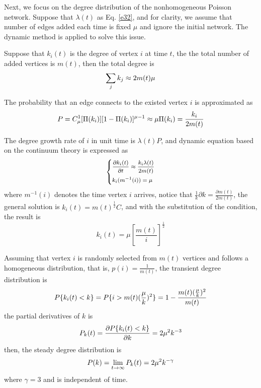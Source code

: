 \documentclass[final]{IEEEtran}
\begin{document}

Next, we focus on the degree distribution of the nonhomogeneous
Poisson network. Suppose that $\lambda (t)$ as Eq. \ref{e32}, and
for clarity, we assume that number of edges added each time is
fixed $\mu$ and ignore the initial network. The dynamic method is
applied to solve this issue.


Suppose that $k_{i}(t)$ is the degree of vertex $i$ at time $t$,
the the total number of added vertices is $m(t)$, then the total
degree is
\begin{equation}\footnotesize
\sum\limits_{j}k_{j}\approx2m(t)\mu
\end{equation}


The probability that an edge connects to the existed vertex $i$ is
approximated as
\begin{equation}\footnotesize
P=C_{\mu}^{1}[\Pi(k_{i})][1-\Pi(k_{i})]^{\mu-1}\approx\mu\Pi(k_{i})=\frac{k_{i}}{2m(t)}
\end{equation}

The degree growth rate of $i$ in unit time is $\lambda (t) P$, and
dynamic equation based on the continuum theory is expressed as
\begin{equation}\footnotesize
  \left\{
   \begin{aligned}
   &\frac{\partial k_{i}(t)}{\partial t} \approx\frac{k_{i}\lambda(t)}{2m(t)}\\
&k_{i}(m^{-1}(i))=\mu\\
   \end{aligned}
   \right.
  \end{equation}
where $m^{-1}(i)$ denotes the time vertex $i$ arrives, notice that
$\frac{1}{k}\partial k$$=$$\frac{\partial m(t)}{2m(t)}$, the
general solution is $k_{i}(t)$$=$$m(t)^{\frac{1}{2}}C$, and with
the substitution of the condition, the result is
\begin{equation}
k_{i}(t)=\mu[\frac{m(t)}{i}]^{\frac{1}{2}}
\end{equation}


Assuming that vertex $i$ is randomly selected from $m(t)$ vertices
and follows a homogeneous distribution, that is,
$p(i)$$=$$\frac{1}{m(t)}$, the transient degree distribution is
\begin{equation}\footnotesize
P\{k_{i}(t)<k\}=P\{i>m(t)(\frac{\mu}{k})^{2}\}=1-\frac{m(t)(\frac{\mu}{k})^{2}}{m(t)}\\
\end{equation}
the partial derivatives of $k$ is
\begin{equation}\footnotesize
P_{k}(t)=\frac{\partial P\{k_{i}(t)<k\}}{\partial
k}=2\mu^{2}k^{-3}
\end{equation}
then, the steady degree distribution is
\begin{equation}\footnotesize
P(k)=\lim\limits_{t\rightarrow\infty}P_{k}(t)=2\mu^{2}k^{-\gamma}
\end{equation}
where $\gamma$$=$$3$ and is independent of time.
\end{document}
